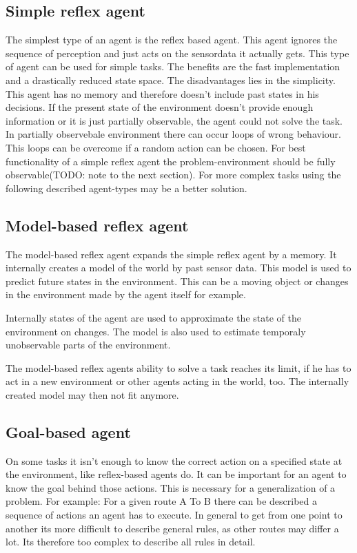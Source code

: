 \documentclass[10pt,a4paper,DIV=11]{scrreprt}
\begin{document}
\subsection{Simple reflex agent}
The simplest type of an agent is the reflex based agent.
This agent ignores the sequence of perception and just acts on the sensordata it actually gets. This type of agent can be used for simple tasks. The benefits are the fast implementation and a drastically reduced state space.
The disadvantages lies in the simplicity. This agent has no memory and therefore doesn't include past states in his decisions. If the present state of the environment doesn't provide enough information or it is just partially observable, the agent could not solve the task.
In partially observebale environment there can occur loops of wrong behaviour. This loops can be overcome if a random action can be chosen.
For best functionality of a simple reflex agent the problem-environment should be fully observable(TODO: note to the next section).
For more complex tasks using the following described agent-types may be a better solution.

\subsection{Model-based reflex agent}
The model-based reflex agent expands the simple reflex agent by a memory. It internally creates a model of the world by past sensor data.
This model is used to predict future states in the environment.
This can be a moving object or changes in the environment made by the agent itself for example.

Internally states of the agent are used to approximate the state of the environment on changes. 
The model is also used to estimate temporaly unobservable parts of the environment.

The model-based reflex agents ability to solve a task reaches its limit, if he has to act in a new environment or other agents acting in the world, too. The internally created model may then not fit anymore.


\subsection{Goal-based agent}
On some tasks it isn't enough to know the correct action on a specified state at the environment, like reflex-based agents do. It can be important for an agent to know the goal behind those actions. This is necessary for a generalization of a problem. For example: For a given route A To B there can be described a sequence of actions an agent has to execute. In general to get from one point to another its more difficult to describe general rules, as other routes may differ a lot. Its therefore too complex to describe all rules in detail. 
\end{document}
